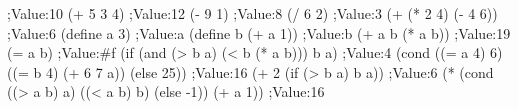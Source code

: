 \begtt{}
;Value:10
(+ 5 3 4)
;Value:12
(- 9 1)
;Value:8
(/ 6 2)
;Value:3
(+ (* 2 4) (- 4 6))
;Value:6
(define a 3)
;Value:a
(define b (+ a 1))
;Value:b
(+ a b (* a b))
;Value:19
(= a b)
;Value:#f
(if (and (> b a) (< b (* a b)))
    b
    a)
;Value:4
(cond ((= a 4) 6)
      ((= b 4) (+ 6 7 a))
      (else 25))
;Value:16
(+ 2 (if (> b a) b a))
;Value:6
(* (cond ((> a b) a)
         ((< a b) b)
         (else -1))
   (+ a 1))
;Value:16
\endtt
